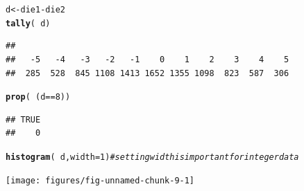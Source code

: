 \documentclass[twoside]{book}\usepackage[]{graphicx}\usepackage[]{xcolor}
\makeatletter
\newcommand{\hlnum}[1]{\textcolor[rgb]{0.686,0.059,0.569}{#1}}%
\newcommand{\hlcom}[1]{\textcolor[rgb]{0.678,0.584,0.686}{\textit{#1}}}%
\newcommand{\hlopt}[1]{\textcolor[rgb]{0,0,0}{#1}}%
\newcommand{\hlstd}[1]{\textcolor[rgb]{0.345,0.345,0.345}{#1}}%
\newcommand{\hlkwb}[1]{\textcolor[rgb]{0.69,0.353,0.396}{#1}}%
\newcommand{\hlkwc}[1]{\textcolor[rgb]{0.333,0.667,0.333}{#1}}%
\newcommand{\hlkwd}[1]{\textcolor[rgb]{0.737,0.353,0.396}{\textbf{#1}}}%
\newenvironment{kframe}{%
 \def\at@end@of@kframe{}%
 \ifinner\ifhmode%
  \def\at@end@of@kframe{\end{minipage}}%
  \begin{minipage}{\columnwidth}%
 \fi\fi%
 \def\FrameCommand##1{\hskip\@totalleftmargin \hskip-\fboxsep
 \colorbox{shadecolor}{##1}\hskip-\fboxsep
     \hskip-\linewidth \hskip-\@totalleftmargin \hskip\columnwidth}%
 \MakeFramed {\advance\hsize-\width
   \@totalleftmargin\z@ \linewidth\hsize
   \@setminipage}}%
 {\par\unskip\endMakeFramed%
 \at@end@of@kframe}
\newenvironment{knitrout}{}{} %
\makeatother
\begin{document}
\begin{solution}
\begin{knitrout}
\color{fgcolor}\begin{kframe}
\begin{alltt}
\hlstd{d} \hlkwb{<-} \hlstd{die1} \hlopt{-} \hlstd{die2}
\hlkwd{tally}\hlstd{(}\hlopt{~}\hlstd{d)}
\end{alltt}
\begin{verbatim}
## 
##   -5   -4   -3   -2   -1    0    1    2    3    4    5 
##  285  528  845 1108 1413 1652 1355 1098  823  587  306
\end{verbatim}
\begin{alltt}
\hlkwd{prop}\hlstd{(}\hlopt{~}\hlstd{(d} \hlopt{==} \hlnum{8}\hlstd{))}
\end{alltt}
\begin{verbatim}
## TRUE 
##    0
\end{verbatim}
\begin{alltt}
\hlkwd{histogram}\hlstd{(}\hlopt{~}\hlstd{d,} \hlkwc{width} \hlstd{=} \hlnum{1}\hlstd{)}  \hlcom{# setting width is important for integer data}
\end{alltt}
\end{kframe}

{\centering \texttt{[image: figures/fig-unnamed-chunk-9-1]} 

}



\end{knitrout}
\end{solution}
\end{document}
